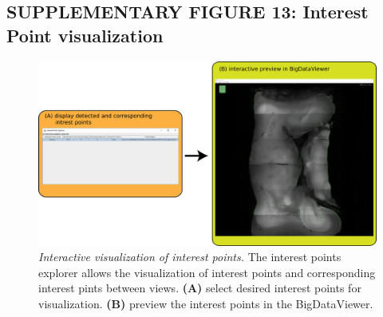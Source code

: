 \documentclass[]{spie}  %
\begin{document}
\pagebreak


\subsection*{SUPPLEMENTARY FIGURE 13: Interest Point visualization}
\vspace{1mm}
\begin{figure}[h!]
\includegraphics[width=\textwidth]{Supp-IntrestPoints.png}
\vspace{-2.0mm}
\caption{\hspace{-0.5mm} \emph{Interactive visualization of interest points.} The interest points explorer allows the visualization of interest points and corresponding interest pints between views. \textbf{(A)} select desired interest points for visualization. \textbf{(B)} preview the interest points in the BigDataViewer.
}
\label{fig:sup-fig-interest-point}
\end{figure}

\pagebreak
\end{document}
